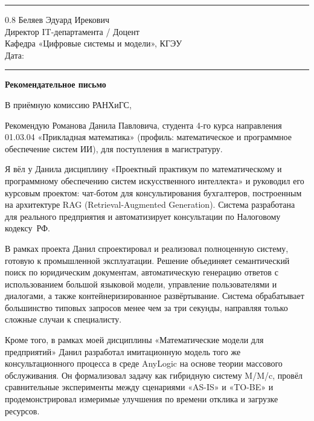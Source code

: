 \documentclass[a4paper,12pt]{article}
\begin{document}
\vspace{4pt}
\noindent\rule{\textwidth}{0.8pt}

\begin{flushright}
  \begin{spacing}{0.8}
    Беляев Эдуард Ирекович\\
    Директор IT-департамента / Доцент\\
    Кафедра «Цифровые системы и модели», КГЭУ\\[6pt]
    Дата: \rule{4cm}{0.4pt}
  \end{spacing}
\end{flushright}

\begin{center}
  {\Large\bfseries Рекомендательное письмо}
\end{center}

В приёмную комиссию РАНХиГС,

Рекомендую Романова Данила Павловича, студента 4-го курса направления 01.03.04 «Прикладная математика» (профиль: ма\-те\-ма\-ти\-че\-ское и про\-грамм\-ное обес\-пе\-че\-ние систем ИИ), для по\-сту\-пле\-ния в ма\-ги\-стра\-ту\-ру.

Я вёл у Данила дисциплину «Проектный практикум по математическому и программному обеспечению систем искусственного интеллекта» и руководил его курсовым проектом: чат-ботом для консультирования бухгалтеров, построенным на архитектуре RAG (Retrieval-Augmented Generation). Система разработана для реального предприятия и автоматизирует консультации по Налоговому кодексу~РФ.

В рамках проекта Данил спроектировал и реализовал полноценную систему, готовую к промышленной эксплуатации. Решение объединяет семантический поиск по юридическим документам, автоматическую генерацию ответов с использованием большой языковой модели, управление пользователями и диалогами, а также контейнеризированное развёртывание. Система обрабатывает большинство типовых запросов менее чем за три секунды, направляя только сложные случаи к специалисту.

Кроме того, в рамках моей дисциплины «Математические модели для предприятий» Данил разработал имитационную модель того же консультационного процесса в среде AnyLogic на основе теории массового обслуживания. Он формализовал задачу как гибридную систему M/M/c, провёл сравнительные эксперименты между сценариями «AS-IS» и «TO-BE» и продемонстрировал измеримые улучшения по времени отклика и загрузке ресурсов.
\end{document}
